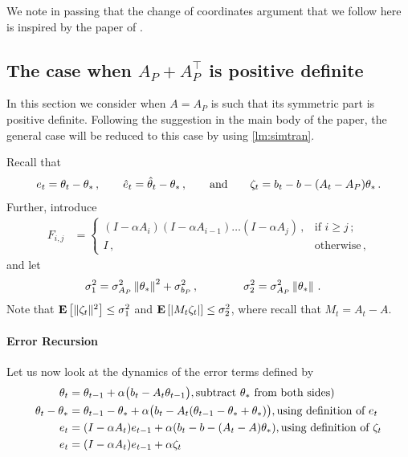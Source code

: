 We note in passing that the change of coordinates argument that we follow here is inspired 
by the paper of \citet{lihong}. 

\subsection{The case when $A_P+A_P^\top$ is positive definite}
In this section we consider  when $A=A_P$ is such that its symmetric part is positive definite.
Following the suggestion in the main body of the paper, the general case will be reduced to this case by using 
\cref{lm:simtran}.

Recall that 
\begin{align*}
e_t =  \theta_t-\theta_*\,, \qquad 
\hat{e}_t = \hat{\theta}_t-\theta_*\,, \qquad  \text{and} \qquad 
\zeta_t = b_t-b-(A_t-A_P)\theta_*\,.
\end{align*}
Further, introduce
\begin{align*}
F_{i,j} & =
\begin{cases}
 (I-\alpha A_i)(I-\alpha A_{i-1}) \dots (I-\alpha A_j)\,, & \text{if } i\ge j\,;\\
 I\,, & \text{otherwise}\,,
\end{cases}
\end{align*}
and let
\begin{align*}
\sigma_1^2 &= \sigma_{A_P}^2\left\| \theta_*\right\|^2+\sigma_{b_P}^2\,, \qquad  \qquad
\sigma_2^2 = \sigma_{A_P}^2\left\| \theta_*\right\|\,.
\end{align*}
Note that $\mathbf{E}\left[\| \zeta_t\|^2\right]\leq \sigma_1^2$ and $\mathbf{E}\left[\left|M_t\zeta_t\right|\right]\leq \sigma_2^2$, where recall that $M_t = A_t - A$. 

\paragraph{Error Recursion} Let us now look at the dynamics of the error terms defined by
\begin{align}\label{eq:errrec}
\begin{split}
\theta_t&=\theta_{t-1}+\alpha\big(b_t-A_t\theta_{t-1}\big), \text{subtract $\theta_*$ from both sides})\\
\theta_t-\theta_*&=\theta_{t-1}-\theta_*+\alpha\big(b_t-A_t(\theta_{t-1}-\theta_*+\theta_*)\big), \text{using definition of $e_t$}\\
e_t&=(I-\alpha A_t)e_{t-1}+\alpha(b_t -b -(A_t-A)\theta_*), \text{using definition of $\zeta_t$}\\
e_t&=(I-\alpha A_t)e_{t-1}+\alpha\zeta_t
\end{split}
\end{align}

